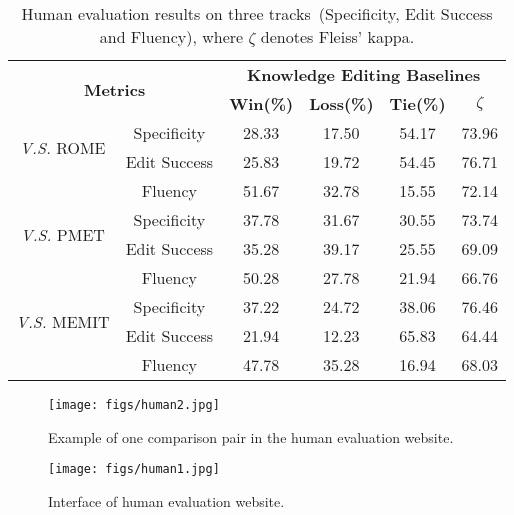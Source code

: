 \begin{table}[!htbp]
\caption{Human evaluation results on three tracks~(Specificity, Edit Success and Fluency), where $\zeta$ denotes Fleiss' kappa.}
    \small
    \centering
    \begin{tabular}{c | c | c c c c}
    \toprule
    \multicolumn{2}{c|}{\multirow{2}{*}{\bf Metrics}} & \multicolumn{4}{c}{\textbf{Knowledge Editing Baselines}} \\
    \cmidrule{3-6} 
    \multicolumn{2}{c|}{} & \bf Win(\%) & \bf Loss(\%) & \bf Tie(\%) & \bf $\zeta$ \\
    \midrule
    \multirow{2}{*}{\textit{V.S.} ROME} & Specificity & 28.33 & 17.50 & 54.17 & 73.96 \\
    & Edit Success  & 25.83 & 19.72 & 54.45 & 76.71 \\
    & Fluency  & 51.67 & 32.78 & 15.55 & 72.14 \\
    \midrule
    \multirow{2}{*}{\textit{V.S.} PMET} & Specificity & 37.78 & 31.67 & 30.55 & 73.74 \\
    & Edit Success  & 35.28 & 39.17 & 25.55 & 69.09 \\
    & Fluency  & 50.28 & 27.78 & 21.94 & 66.76 \\
    \midrule
    \multirow{2}{*}{\textit{V.S.} MEMIT} & Specificity   & 37.22 & 24.72 & 38.06 & 76.46 \\
    & Edit Success  & 21.94 & 12.23 & 65.83 & 64.44 \\
    & Fluency  & 47.78 & 35.28 & 16.94 & 68.03 \\
    \bottomrule
    \end{tabular}
    \vspace{0.25cm}
    \label{tab:human_eval_cases}
\end{table}

\begin{figure}[!htbp]
  \centering
  \texttt{[image: figs/human2.jpg]}
  \caption{Example of one comparison pair in the human evaluation website.}
  \label{fig:human_eval1}
\end{figure}

\begin{figure}[htbp]
  \centering
  \texttt{[image: figs/human1.jpg]}
  \caption{Interface of human evaluation website.}
  \label{fig:human_eval2}
\end{figure}

